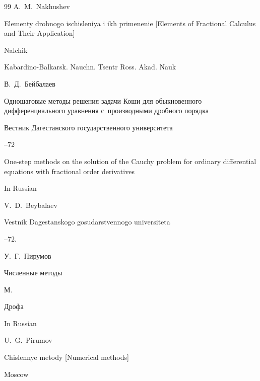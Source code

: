 \begin{thebibliography}{99}
\by A.~M.~Nakhushev

\book Elementy drobnogo ischisleniya i ikh primenenie \rm [Elements of Fractional Calculus and Their Application] 

\publaddr Nalchik

\publ Kabardino-Balkarsk. Nauchn. Tsentr Ross. Akad. Nauk








\by В.~Д.~Бейбалаев

\paper Одношаговые методы решения задачи Коши для обыкновенного дифференциального уравнения с~производными дробного порядка

\jour Вестник Дагестанского государственного университета



--72


\misctransl 

\paper One-step methods on the solution of the Cauchy problem for ordinary differential equations with fractional order derivatives

\lang In Russian

\by V.~D.~Beybalaev

\jour Vestnik Dagestanskogo gosudarstvennogo universiteta



--72.








\by У.~Г.~Пирумов

\book Численные методы

\publaddr М.

\publ Дрофа



\misctransl

\lang In Russian

\by U.~G.~Pirumov

\book Chislennye metody \rm [Numerical methods]

\publaddr Moscow


\end{thebibliography}
